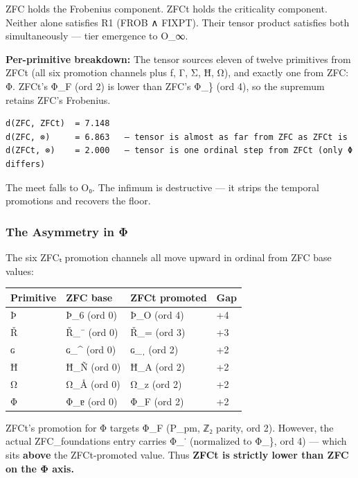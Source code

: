 ZFC holds the Frobenius component. ZFCt holds the criticality component.
Neither alone satisfies R1 (FROB ∧ FIXPT). Their tensor product
satisfies both simultaneously --- tier emergence to O\_∞.

\textbf{Per-primitive breakdown:} The tensor sources eleven of twelve
primitives from ZFCt (all six promotion channels plus
{\igprimfont\upshape ƒ}, Γ, Σ, {\igprimfont\upshape Ħ}, Ω), and exactly
one from ZFC: Φ. ZFCt's Φ\_F (ord 2) is lower than ZFC's Φ\_\} (ord 4),
so the supremum retains ZFC's Frobenius.

\begin{verbatim}
d(ZFC, ZFCt)  = 7.148
d(ZFC, ⊗)     = 6.863   — tensor is almost as far from ZFC as ZFCt is
d(ZFCt, ⊗)    = 2.000   — tensor is one ordinal step from ZFCt (only Φ differs)
\end{verbatim}

The meet falls to O₀. The infimum is destructive --- it strips the
temporal promotions and recovers the floor.

\subsubsection{The Asymmetry in Φ}\label{the-asymmetry-in-ux3c6}

The six ZFCₜ promotion channels all move upward in ordinal from ZFC base
values:

{\def\LTcaptype{none} %
\begin{longtable}[]{@{}llll@{}}
\toprule\noalign{}
Primitive & ZFC base & ZFCt promoted & Gap \\
\midrule\noalign{}
\endhead
\bottomrule\noalign{}
\endlastfoot
Þ & Þ\_6 (ord 0) & Þ\_O (ord 4) & +4 \\
Ř & Ř\_¯ (ord 0) & Ř\_= (ord 3) & +3 \\
{\igprimfont\upshape ɢ} & {\igprimfont\upshape ɢ}\_\^{} (ord 0) &
{\igprimfont\upshape ɢ}\_{\igprimfont\upshape ˌ} (ord 2) & +2 \\
{\igprimfont\upshape Ħ} & {\igprimfont\upshape Ħ}\_Ñ (ord 0) &
{\igprimfont\upshape Ħ}\_A (ord 2) & +2 \\
Ω & Ω\_Å (ord 0) & Ω\_z (ord 2) & +2 \\
Φ & Φ\_{\igprimfont\upshape ɐ} (ord 0) & Φ\_F (ord 2) & +2 \\
\end{longtable}
}

ZFCt's promotion for Φ targets Φ\_F (P\_pm, ℤ₂ parity, ord 2). However,
the actual ZFC\_foundations entry carries Φ\_˙ (normalized to Φ\_\}, ord
4) --- which sits \textbf{above} the ZFCt-promoted value. Thus
\textbf{ZFCt is strictly lower than ZFC on the Φ axis.}

